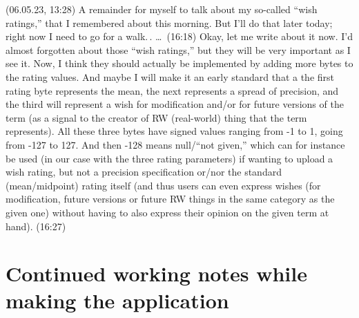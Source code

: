 \documentclass{report}
\begin{document}
(06.05.23, 13:28) A remainder for myself to talk about my so-called ``wish ratings,'' that I remembered about this morning. But I'll do that later today; right now I need to go for a walk.\,. 
\ldots\ (16:18) Okay, let me write about it now. I'd almost forgotten about those ``wish ratings,'' but they will be very important as I see it. Now, I think they should actually be implemented by adding more bytes to the rating values. And maybe I will make it an early standard that a the first rating byte represents the mean, the next represents a spread of precision, and the third will represent a wish for modification and/or for future versions of the term (as a signal to the creator of RW (real-world) thing that the term represents). All these three bytes have signed values ranging from -1 to 1, going from -127 to 127. And then -128 means null/``not given,'' which can for instance be used (in our case with the three rating parameters) if wanting to upload a wish rating, but not a precision specification or/nor the standard (mean/midpoint) rating itself (and thus users can even express wishes (for modification, future versions or future RW things in the same category as the given one) without having to also express their opinion on the given term at hand). (16:27)


\section{Continued working notes while making the application}
\end{document}
